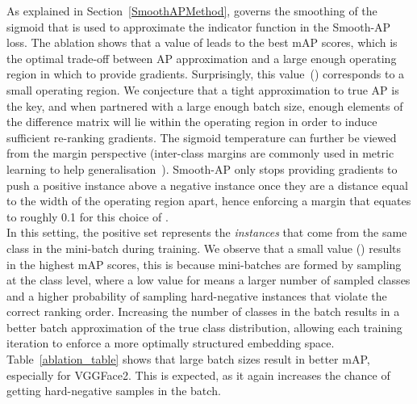 \documentclass[runningheads]{llncs}
\begin{document}
 

As explained in Section~\ref{SmoothAPMethod}, 
 governs the smoothing of the sigmoid that is used to approximate the indicator function in the Smooth-AP loss. The ablation shows that a value of  leads to the best mAP scores, which is the optimal trade-off between AP approximation and a large enough operating region in which to provide gradients.
Surprisingly, this value~() corresponds to a small operating region.
We conjecture that a tight approximation to true AP is the key, 
and when partnered with a large enough batch size, 
enough elements of the difference matrix will lie within the operating region in order to induce sufficient re-ranking gradients. 
The sigmoid temperature can further be viewed from the margin perspective (inter-class margins are commonly used in metric learning to help generalisation~\cite{Chopra05,Hyun16,Weinberger06}). 
Smooth-AP only stops providing gradients to push a positive instance above a negative instance once they are a distance equal to the width of the operating region apart, 
hence enforcing a margin that equates to roughly 0.1 for this choice of . \\


In this setting, 
the positive set represents the \textit{instances} that come from the same class in the mini-batch during training.
We observe that a small value () results in the highest mAP scores, 
this is because mini-batches are formed by sampling at the class level, 
where a low value for  means a larger number of sampled classes and a higher probability of sampling hard-negative instances that violate the correct ranking order.
Increasing the number of classes in the batch results in a better batch approximation of the true class distribution, 
allowing each training iteration to enforce a more optimally structured embedding space. \\

Table~\ref{ablation_table} shows that large batch sizes result in better mAP, especially for VGGFace2. 
This is expected, as it again increases the chance of getting hard-negative samples in the batch.
\end{document}
